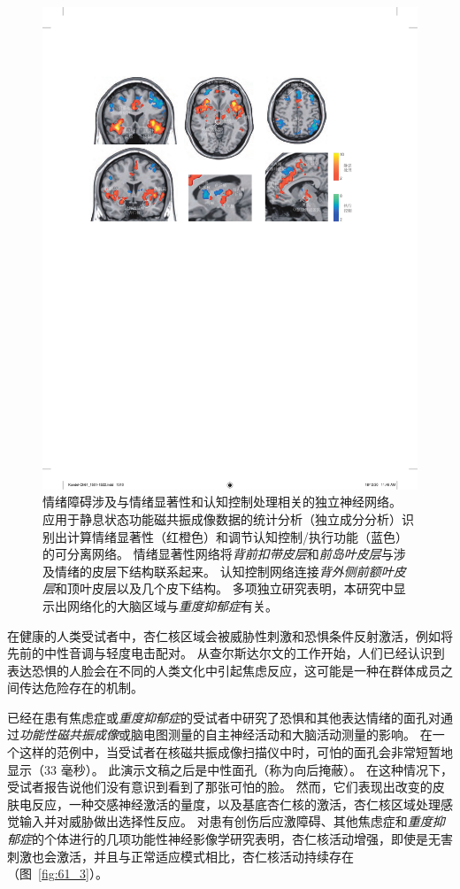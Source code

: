 \begin{figure}[htbp]
	\centering
	\includegraphics[width=1.0\linewidth]{chap61/fig_61_2}
	\caption{情绪障碍涉及与情绪显著性和认知控制处理相关的独立神经网络。
		应用于静息状态功能磁共振成像数据的统计分析（独立成分分析）识别出计算情绪显著性（红橙色）和调节认知控制/执行功能（蓝色）的可分离网络。
		情绪显著性网络将\textit{背前扣带皮层}和\textit{前岛叶皮层}与涉及情绪的皮层下结构联系起来。
		认知控制网络连接\textit{背外侧前额叶皮层}和顶叶皮层以及几个皮下结构。
		多项独立研究表明，本研究中显示出网络化的大脑区域与\textit{重度抑郁症}有关\cite{seeley2007dissociable}。}
	\label{fig:61_2}
\end{figure}


在健康的人类受试者中，杏仁核区域会被威胁性刺激和恐惧条件反射激活，例如将先前的中性音调与轻度电击配对。
从查尔斯达尔文的工作开始，人们已经认识到表达恐惧的人脸会在不同的人类文化中引起焦虑反应，这可能是一种在群体成员之间传达危险存在的机制。


已经在患有焦虑症或\textit{重度抑郁症}的受试者中研究了恐惧和其他表达情绪的面孔对通过\textit{功能性磁共振成像}或脑电图测量的自主神经活动和大脑活动测量的影响。
在一个这样的范例中，当受试者在核磁共振成像扫描仪中时，可怕的面孔会非常短暂地显示（33 毫秒）。
此演示文稿之后是中性面孔（称为向后掩蔽）。
在这种情况下，受试者报告说他们没有意识到看到了那张可怕的脸。
然而，它们表现出改变的皮肤电反应，一种交感神经激活的量度，以及基底杏仁核的激活，杏仁核区域处理感觉输入并对威胁做出选择性反应。
对患有创伤后应激障碍、其他焦虑症和\textit{重度抑郁症}的个体进行的几项功能性神经影像学研究表明，杏仁核活动增强，即使是无害刺激也会激活，并且与正常适应模式相比，杏仁核活动持续存在（图~\ref{fig:61_3}）。


